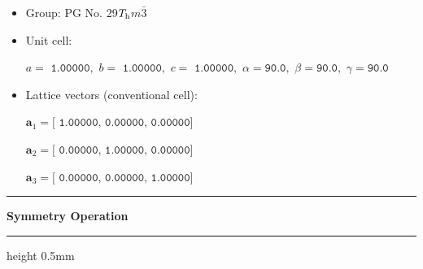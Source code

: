 \documentclass[fleqn,10pt,landscape]{jsarticle}
\begin{document}
\begin{itemize}
\item Group: PG No. 29\quad$T_{\rm h}$\quad$m\bar{3}$\quad[ cubic ]
\end{itemize}
\begin{itemize}
\item Unit cell:

\quad $a=\texttt{ 1.00000},\,\, b=\texttt{ 1.00000},\,\, c=\texttt{ 1.00000},\,\, \alpha=\texttt{90.0},\,\, \beta=\texttt{90.0},\,\, \gamma=\texttt{90.0}$

\item Lattice vectors (conventional cell):

\quad $\bm{a}_1=\texttt{[ 1.00000, 0.00000, 0.00000]}$

\quad $\bm{a}_2=\texttt{[ 0.00000, 1.00000, 0.00000]}$

\quad $\bm{a}_3=\texttt{[ 0.00000, 0.00000, 1.00000]}$

\end{itemize}
\vspace{5mm}
\noindent \rule[0.5mm]{5mm}{0.5mm}\hspace{3mm}\textbf{Symmetry Operation}\hspace{3mm}\leaders\hrule height 0.5mm\hfill\kern0pt
\vspace{3mm}
\end{document}
